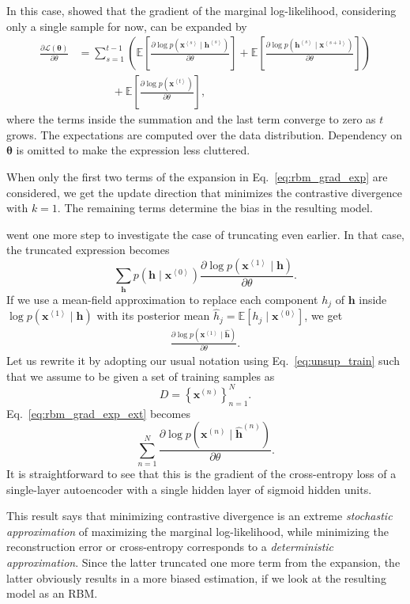 \documentclass[dissertation,nocontribution,draft*]{aaltoseries}
\newcommand{\qt}[1]{\left<#1\right>}
\newcommand{\vect}[1]{\mathbf{#1}}
\newcommand{\vects}[1]{\boldsymbol{#1}}
\newcommand{\vh}[0]{\vect{h}}
\newcommand{\vx}[0]{\vect{x}}
\newcommand{\TT}[0]{{\vects{\theta}}}
\newcommand{\LL}[0]{\mathcal{L}}
\newcommand{\E}[0]{\mathbb{E}}
\begin{document}
In this case, \citet{Bengio2009} showed that the gradient of
the marginal log-likelihood, considering only a single
sample for now, can be expanded by
\begin{align}
    \label{eq:rbm_grad_exp}
    \frac{\partial \LL(\TT)}{\partial \theta} &= 
    \sum_{s=1}^{t-1} \left( \E\left[ \frac{\partial \log
    p(\vx^{\qt{s}} \mid \vh^{\qt{s}})}{\partial \theta}
    \right]  + \E \left[ \frac{\partial \log p(\vh^{\qt{s}}
    \mid \vx^{\qt{s+1}} )}{\partial \theta} \right]
    \right) 
    \nonumber \\
    &\phantom{\sum_{s=1}^{t-1}} + \E \left[ \frac{\partial \log
    p(\vx^{\qt{t}})}{\partial \theta} 
    \right],
\end{align}
where the terms inside the summation and the last term
converge to zero as $t$ grows. The expectations are computed
over the data distribution. Dependency on $\TT$ is omitted
to make the expression less cluttered.

When only the first two terms of the expansion in
Eq.~\eqref{eq:rbm_grad_exp} are considered, we get the
update direction that minimizes the contrastive divergence
with $k=1$.
The remaining terms determine the bias in the resulting
model.

\citet{Bengio2009} went one more step to investigate the
case of truncating even earlier. In that case, the truncated
expression becomes
\[
\sum_{\vh} p(\vh \mid \vx^{\qt{0}}) \frac{\partial \log
p(\vx^{\qt{1}} \mid \vh)}{\partial \theta}.
\]
If we use a mean-field approximation to replace
each component $h_j$ of $\vh$ inside $\log
p(\vx^{\qt{1}} \mid \vh)$ with its posterior mean $\hat{h}_j =
\E\left[ h_j \mid \vx^{\qt{0}} \right]$, we get
\begin{align}
    \label{eq:rbm_grad_exp_ext}
    \frac{\partial \log p(\vx^{\qt{1}} \mid \hat{\vh})}{\partial \theta}.
\end{align}
Let us rewrite it by adopting our usual notation using
Eq.~\eqref{eq:unsup_train} such that we assume to be given
a set of training samples as
\[
D=\left\{ \vx^{(n)} \right\}_{n=1}^N.
\]
Eq.~\eqref{eq:rbm_grad_exp_ext} becomes
\[
\sum_{n=1}^N \frac{\partial \log p(\vx^{(n)} \mid
\hat{\vh}^{(n)})}{\partial \theta}.
\]
It is straightforward to see that this is the gradient of
the cross-entropy loss of a single-layer autoencoder with a
single hidden layer of sigmoid hidden units.

This result says that minimizing contrastive divergence is
an extreme \textit{stochastic approximation} of maximizing
the marginal log-likelihood, while minimizing the
reconstruction error or cross-entropy corresponds to a
\textit{deterministic approximation}. Since the latter
truncated one more term from the expansion, the latter
obviously results in a more biased estimation, if we look at
the resulting model as an RBM. 
\end{document}
